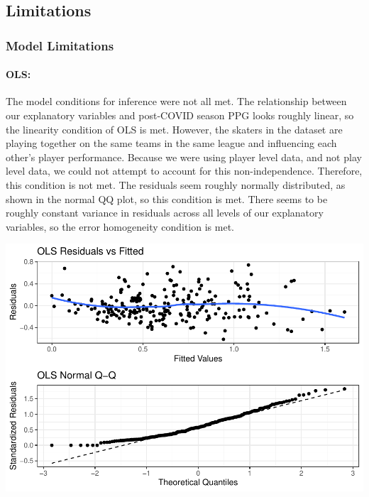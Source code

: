 \documentclass[12pt]{article}
\begin{document}
\hypertarget{limitations}{%
\subsection{Limitations}\label{limitations}}

\hypertarget{model-limitations}{%
\subsubsection{Model Limitations}\label{model-limitations}}

\hypertarget{ols-1}{%
\paragraph{OLS:}\label{ols-1}}

The model conditions for inference were not all met. The relationship
between our explanatory variables and post-COVID season PPG looks
roughly linear, so the linearity condition of OLS is met. However, the
skaters in the dataset are playing together on the same teams in the
same league and influencing each other's player performance. Because we
were using player level data, and not play level data, we could not
attempt to account for this non-independence. Therefore, this condition
is not met. The residuals seem roughly normally distributed, as shown in
the normal QQ plot, so this condition is met. There seems to be roughly
constant variance in residuals across all levels of our explanatory
variables, so the error homogeneity condition is met.

\includegraphics{journal-article-nb_files/figure-latex/ols-limitation-plots-1.pdf}
\end{document}
